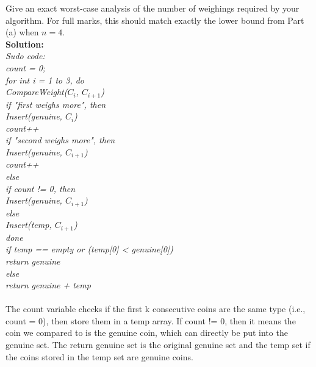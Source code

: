 \documentclass[12pt]{article}
\begin{document}
\begin{itemize}
Give an exact worst-case analysis of the number of weighings required
by your algorithm.  For full marks, this should match exactly the
lower bound from Part (a) when $n = 4$.
\\\textbf{Solution:}
\\\textit{Sudo code:}
\\\textit{count = 0;
\\for int i = 1 to 3, do
\\CompareWeight($C_i$, $C_{i+1}$)
\\if "first weighs more", then
\\Insert(genuine, $C_i$)
\\count++
\\if "second weighs more", then
\\Insert(genuine, $C_{i+1}$)
\\count++
\\else
\\if count != 0, then 
\\Insert(genuine, $C_{i+1}$)
\\else
\\Insert(temp, $C_{i+1}$)
\\done
\\if temp == empty or (temp[0] < genuine[0])
\\return genuine
\\else
\\return genuine + temp
\\}
\\The count variable checks if the first k consecutive coins are the same type (i.e., count = 0), then store them in a temp array. If count != 0, then it means the coin we compared to is the genuine coin, which can directly be put into the genuine set. The return genuine set is the original genuine set and the temp set if the coins stored in the temp set are genuine coins. 

\end{itemize}
\end{document}
